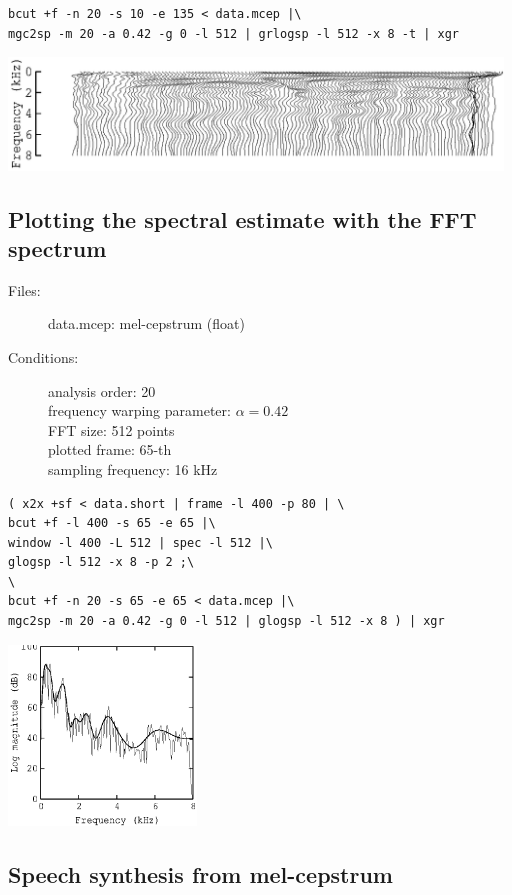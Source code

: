 \documentclass[a4paper,10pt]{article}
\begin{document}
\begin{verbatim}
bcut +f -n 20 -s 10 -e 135 < data.mcep |\
mgc2sp -m 20 -a 0.42 -g 0 -l 512 | grlogsp -l 512 -x 8 -t | xgr
\end{verbatim}

\includegraphics[height=3cm]{eps/data.mcep.grlogsp-t.eps}

\subsection{Plotting the spectral estimate with the FFT spectrum}

\begin{description}
\item[Files:]
  data.mcep: mel-cepstrum (float)
\item[Conditions:]
  analysis order: 20\\
  frequency warping parameter: $\alpha = 0.42$\\
  FFT size: 512 points\\
  plotted frame: 65-th\\
  sampling frequency: 16 kHz
\end{description}

\begin{verbatim}
( x2x +sf < data.short | frame -l 400 -p 80 | \
bcut +f -l 400 -s 65 -e 65 |\
window -l 400 -L 512 | spec -l 512 |\
glogsp -l 512 -x 8 -p 2 ;\
\
bcut +f -n 20 -s 65 -e 65 < data.mcep |\
mgc2sp -m 20 -a 0.42 -g 0 -l 512 | glogsp -l 512 -x 8 ) | xgr
\end{verbatim}

\includegraphics[width=5cm]{eps/data.mcep.glogsp.eps}

\subsection{Speech synthesis from mel-cepstrum}
\end{document}
